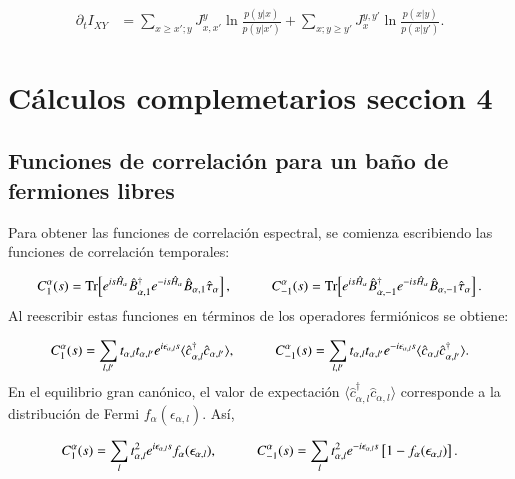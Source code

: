 \begin{appendixs}
\begin{align*}
    \partial_{t} I_{XY} 
    &= \sum_{x \geq x';y} J_{x,x'}^{y} \ln \frac{p(y|x)}{p(y|x')} 
     + \sum_{x;y \geq y'} J_{x}^{y,y'} \ln \frac{p(x|y)}{p(x|y')}.
\end{align*}

    \label{apendix4:secondlaw}


\newpage

\section{Cálculos complemetarios seccion 4}
\label{apendixsection4}


\subsection{Funciones de correlación para un baño de fermiones libres}

Para obtener las funciones de correlación espectral, se comienza escribiendo las funciones de correlación temporales:

\begin{equation*}
    C_{1}^{\alpha}(s) = \text{Tr}\!\left[e^{is\hat{H}_{\alpha}}\hat{B}^{\dagger}_{\alpha,1}e^{-is\hat{H}_{\alpha}}\hat{B}_{\alpha,1}\hat{\tau}_{\alpha}  \right], 
    \hspace{10mm} 
    C_{-1}^{\alpha}(s) = \text{Tr}\!\left[e^{is\hat{H}_{\alpha}}\hat{B}^{\dagger}_{\alpha,-1}e^{-is\hat{H}_{\alpha}}\hat{B}_{\alpha,-1}\hat{\tau}_{\alpha}  \right].
\end{equation*}
Al reescribir estas funciones en términos de los operadores fermiónicos se obtiene:

\begin{equation*}
    C_{1}^{\alpha}(s) = \sum_{l,l'} t_{\alpha,l}t_{\alpha,l'} e^{i\epsilon_{\alpha,l}s} 
    \langle \hat{c}^{\dagger}_{\alpha,l}\hat{c}_{\alpha,l'} \rangle, 
    \hspace{10mm} 
    C^{\alpha}_{-1}(s) = \sum_{l,l'} t_{\alpha,l}t_{\alpha,l'} e^{-i\epsilon_{\alpha,l}s} 
    \langle \hat{c}_{\alpha,l}\hat{c}^{\dagger}_{\alpha,l'} \rangle.
\end{equation*}
En el equilibrio gran canónico, el valor de expectación $\langle \hat{c}^{\dagger}_{\alpha,l}\hat{c}_{\alpha,l}\rangle$ corresponde a la distribución de Fermi $f_{\alpha}(\epsilon_{\alpha,l})$. Así,

\begin{equation*}
    C_{1}^{\alpha}(s) = \sum_{l} t^{2}_{\alpha,l} e^{i\epsilon_{\alpha,l}s} f_{\alpha}(\epsilon_{\alpha,l}), 
    \hspace{10mm} 
    C^{\alpha}_{-1}(s) = \sum_{l} t^{2}_{\alpha,l} e^{-i\epsilon_{\alpha,l}s} \left[1-f_{\alpha}(\epsilon_{\alpha,l})\right].
\end{equation*}
\\


\end{appendixs}
